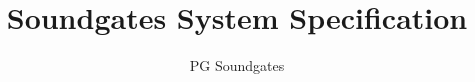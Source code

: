 \documentclass[]{scrreprt}
\title{Soundgates System Specification}
\author{PG Soundgates}
\begin{document}
\maketitle
\tableofcontents
\begin{abstract}
\end{abstract}



\end{document}
